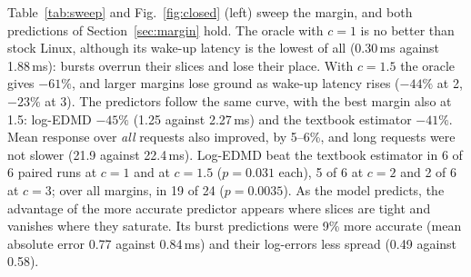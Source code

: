 \documentclass[conference,onecolumn,11pt]{IEEEtran}
\begin{document}
Table~\ref{tab:sweep} and Fig.~\ref{fig:closed} (left) sweep the margin, and both predictions of Section~\ref{sec:margin} hold. The oracle with $c=1$ is no better than stock Linux, although its wake-up latency is the lowest of all (0.30\,ms against 1.88\,ms): bursts overrun their slices and lose their place. With $c=1.5$ the oracle gives $-61\%$, and larger margins lose ground as wake-up latency rises ($-44\%$ at 2, $-23\%$ at 3). The predictors follow the same curve, with the best margin also at 1.5: log-EDMD $-45\%$ (1.25 against 2.27\,ms) and the textbook estimator $-41\%$. Mean response over \emph{all} requests also improved, by 5--6\%, and long requests were not slower (21.9 against 22.4\,ms). Log-EDMD beat the textbook estimator in 6 of 6 paired runs at $c=1$ and at $c=1.5$ ($p=0.031$ each), 5 of 6 at $c=2$ and 2 of 6 at $c=3$; over all margins, in 19 of 24 ($p=0.0035$). As the model predicts, the advantage of the more accurate predictor appears where slices are tight and vanishes where they saturate. Its burst predictions were 9\% more accurate (mean absolute error 0.77 against 0.84\,ms) and their log-errors less spread (0.49 against 0.58).
\end{document}
